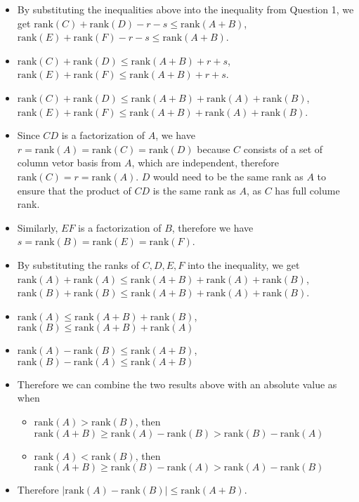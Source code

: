 \documentclass[10pt]{article}
\begin{document}
{{\begin{enumerate}
\begin{itemize}
\begin{itemize}
				\item Since \( \text{col}(E) \subseteq \text{col}(X) \), then \( \text{rank}(E) \leq \text{rank}(X) \).
				\item Since \( \text{row}(D) \subseteq \text{row}(Y) \), then \( \text{rank}(D) \leq \text{rank}(Y) \).
				\item Since \( \text{row}(F) \subseteq \text{row}(Y) \), then \( \text{rank}(F) \leq \text{rank}(Y) \).
			\end{itemize}
			\item By substituting the inequalities above into the inequality from Question 1, we get \( \text{rank}(C) + \text{rank}(D) - r - s \leq \text{rank}(A+B) \), \(\text{rank}(E) + \text{rank}(F) - r - s \leq \text{rank}(A+B)\).
			\item \(\text{rank}(C) + \text{rank}(D) \leq \text{rank}(A + B) + r + s\), \(\text{rank}(E) + \text{rank}(F) \leq \text{rank}(A + B) + r + s\).
			\item \(\text{rank}(C) + \text{rank}(D) \leq \text{rank}(A + B) + \text{rank}(A) + \text{rank}(B)\), \(\text{rank}(E) + \text{rank}(F) \leq \text{rank}(A + B) + \text{rank}(A) + \text{rank}(B)\).
			\item Since \(CD\) is a factorization of \(A\), we have \(r = \text{rank}(A) = \text{rank}(C) = \text{rank}(D)\) because $C$ consists of a set of column vetor basis from $A$, which are independent, therefore \(\text{rank}(C) = r = \text{rank}(A)\). $D$ would need to be the same rank as $A$ to ensure that the product of $CD$ is the same rank as $A$, as $C$ has full colume rank.
			\item Similarly, \(EF\) is a factorization of \(B\), therefore we have \(s = \text{rank}(B) = \text{rank}(E) = \text{rank}(F)\).
			\item By substituting the ranks of \(C, D, E, F\) into the inequality, we get \(\text{rank}(A) + \text{rank}(A) \leq \text{rank}(A + B) + \text{rank}(A) + \text{rank}(B)\), \(\text{rank}(B) + \text{rank}(B) \leq \text{rank}(A + B) + \text{rank}(A) + \text{rank}(B)\).
			\item \(\text{rank}(A) \leq \text{rank}(A + B) + \text{rank}(B)\), \(\text{rank}(B) \leq \text{rank}(A + B) + \text{rank}(A)\)
			\item \(\text{rank}(A) - \text{rank}(B) \leq \text{rank}(A + B)\), \(\text{rank}(B) - \text{rank}(A) \leq \text{rank}(A + B)\)
			\item Therefore we can combine the two results above with an absolute value as when 
			\begin{itemize}
				\item \(\text{rank}(A) > \text{rank}(B)\), then \(\text{rank}(A + B) \geq \text{rank}(A) - \text{rank}(B) > \text{rank}(B) - \text{rank}(A)\)
				\item \(\text{rank}(A) < \text{rank}(B)\), then \(\text{rank}(A + B) \geq \text{rank}(B) - \text{rank}(A) > \text{rank}(A) - \text{rank}(B)\)
			\end{itemize}
			\item Therefore \(| \text{rank}(A) - \text{rank}(B) | \leq \text{rank}(A + B)\).
		\end{itemize}
	\end{enumerate}

	}
}
\end{document}
